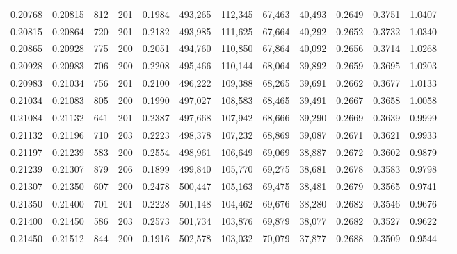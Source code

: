 \begin{tabular}{rrrrrrrrrrrrr}
0.20768 & 0.20815 &   812 & 201 &                                     0.1984 & 493,265 & 112,345 &  67,463 &  40,493 & 0.2649 & 0.3751 & 1.0407 \\
0.20815 & 0.20864 &   720 & 201 &                                     0.2182 & 493,985 & 111,625 &  67,664 &  40,292 & 0.2652 & 0.3732 & 1.0340 \\
0.20865 & 0.20928 &   775 & 200 &                                     0.2051 & 494,760 & 110,850 &  67,864 &  40,092 & 0.2656 & 0.3714 & 1.0268 \\
0.20928 & 0.20983 &   706 & 200 &                                     0.2208 & 495,466 & 110,144 &  68,064 &  39,892 & 0.2659 & 0.3695 & 1.0203 \\
0.20983 & 0.21034 &   756 & 201 &                                     0.2100 & 496,222 & 109,388 &  68,265 &  39,691 & 0.2662 & 0.3677 & 1.0133 \\
0.21034 & 0.21083 &   805 & 200 &                                     0.1990 & 497,027 & 108,583 &  68,465 &  39,491 & 0.2667 & 0.3658 & 1.0058 \\
0.21084 & 0.21132 &   641 & 201 &                                     0.2387 & 497,668 & 107,942 &  68,666 &  39,290 & 0.2669 & 0.3639 & 0.9999 \\
0.21132 & 0.21196 &   710 & 203 &                                     0.2223 & 498,378 & 107,232 &  68,869 &  39,087 & 0.2671 & 0.3621 & 0.9933 \\
0.21197 & 0.21239 &   583 & 200 &                                     0.2554 & 498,961 & 106,649 &  69,069 &  38,887 & 0.2672 & 0.3602 & 0.9879 \\
0.21239 & 0.21307 &   879 & 206 &                                     0.1899 & 499,840 & 105,770 &  69,275 &  38,681 & 0.2678 & 0.3583 & 0.9798 \\
0.21307 & 0.21350 &   607 & 200 &                                     0.2478 & 500,447 & 105,163 &  69,475 &  38,481 & 0.2679 & 0.3565 & 0.9741 \\
0.21350 & 0.21400 &   701 & 201 &                                     0.2228 & 501,148 & 104,462 &  69,676 &  38,280 & 0.2682 & 0.3546 & 0.9676 \\
0.21400 & 0.21450 &   586 & 203 &                                     0.2573 & 501,734 & 103,876 &  69,879 &  38,077 & 0.2682 & 0.3527 & 0.9622 \\
0.21450 & 0.21512 &   844 & 200 &                                     0.1916 & 502,578 & 103,032 &  70,079 &  37,877 & 0.2688 & 0.3509 & 0.9544 \\

\end{tabular}
